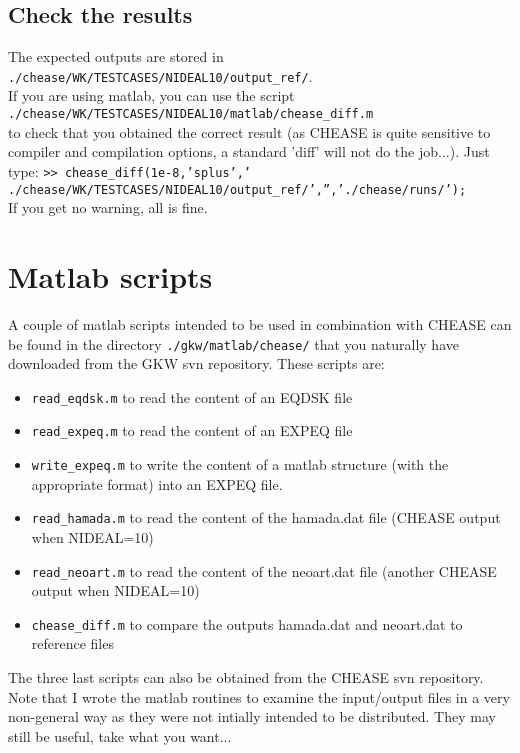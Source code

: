 \documentclass[a4paper,12pt]{article}
\begin{document}
\subsection{Check the results}
The expected outputs are stored in\\
 \texttt{./chease/WK/TESTCASES/NIDEAL10/output\_ref/}.\\
If you are using matlab, you can use the script\\
\texttt{./chease/WK/TESTCASES/NIDEAL10/matlab/chease\_diff.m}\\
to check that you obtained the correct result (as CHEASE is quite sensitive to compiler and compilation options, a standard 'diff' will not do the job...). Just type:
\texttt{\small >> chease\_diff(1e-8,'splus',' ./chease/WK/TESTCASES/NIDEAL10/output\_ref/','','./chease/runs/');}\\
If you get no warning, all is fine. 

\section{Matlab scripts}
A couple of matlab scripts intended to be used in combination with CHEASE can be found in the directory \texttt{./gkw/matlab/chease/} that you naturally have downloaded from the GKW svn repository. These scripts are:
\begin{itemize}
 \item \texttt{read\_eqdsk.m} to read the content of an EQDSK file
 \item \texttt{read\_expeq.m}  to read the content of an EXPEQ file
 \item \texttt{write\_expeq.m} to write the content of a matlab structure (with the appropriate format) into an EXPEQ file.
 \item \texttt{read\_hamada.m} to read the content of the hamada.dat file (CHEASE output when NIDEAL=10)
 \item \texttt{read\_neoart.m} to read the content of the neoart.dat file (another CHEASE output when NIDEAL=10)
 \item \texttt{chease\_diff.m} to compare the outputs hamada.dat and neoart.dat to reference files
\end{itemize}
The three last scripts can also be obtained from the CHEASE svn repository.\\

Note that I wrote the matlab routines to examine the input/output files in a very non-general way as they were not intially intended to be distributed. They may still be useful, take what you want...\\
\end{document}
